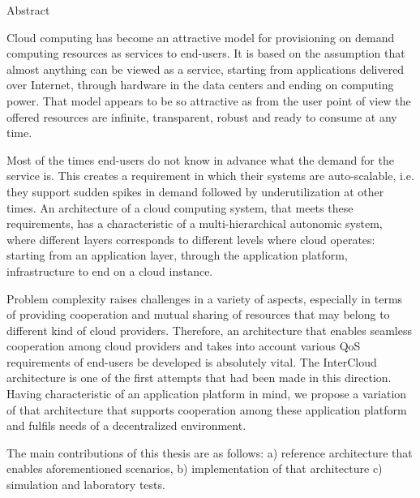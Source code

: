 \vspace*{0.5cm}

\begin{center}
  \LARGE Abstract
\end{center}

Cloud computing has become an attractive model for provisioning on demand computing resources as services to end-users. It is based on the assumption that almost anything can be viewed as a service, starting from applications delivered over Internet, through hardware in the data centers and ending on computing power. That model appears to be so attractive as from the user point of view the offered resources are infinite, transparent, robust and ready to consume at any time.

Most of the times end-users do not know in advance what the demand for the service is. This creates a requirement in which their systems are auto-scalable, i.e. they support sudden spikes in demand followed by underutilization at other times. An architecture of a cloud computing system, that meets these requirements, has a characteristic of a multi-hierarchical autonomic system, where different layers corresponds to different levels where cloud operates: starting from an application layer, through the application platform, infrastructure to end on a cloud instance.

Problem complexity raises challenges in a variety of aspects, especially in terms of providing cooperation and mutual sharing of resources that may belong to different kind of cloud providers. Therefore, an architecture that enables seamless cooperation among cloud providers and takes into account various QoS requirements of end-users be developed is absolutely vital. The InterCloud architecture is one of the first attempts that had been made in this direction. Having characteristic of an application platform in mind, we propose a variation of that architecture that supports cooperation among these application platform and fulfils needs of a decentralized environment.

The main contributions of this thesis are as follows: a) reference architecture that enables aforementioned scenarios, b) implementation of that architecture c) simulation and laboratory tests.


